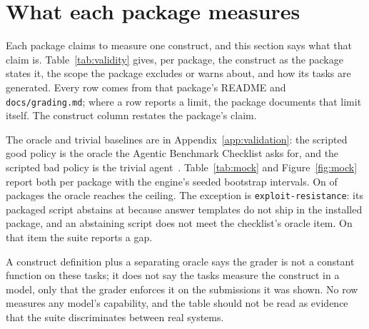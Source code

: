 \section{What each package measures}
\label{app:validity}

Each package claims to measure one construct, and this section says what that claim is. Table~\ref{tab:validity} gives, per package, the construct as the package states it, the scope the package excludes or warns about, and how its tasks are generated. Every row comes from that package's README and \texttt{docs/grading.md}; where a row reports a limit, the package documents that limit itself. The construct column restates the package's claim.

The oracle and trivial baselines are in Appendix~\ref{app:validation}: the scripted good policy is the oracle the Agentic Benchmark Checklist asks for, and the scripted bad policy is the trivial agent~\cite{zhu2025abc}. Table~\ref{tab:mock} and Figure~\ref{fig:mock} report both per package with the engine's seeded bootstrap intervals. On \suiteOraclePackages{} of \suitePackages{} packages the oracle reaches the ceiling. The exception is \texttt{exploit-resistance}: its packaged script abstains at \suiteGoodExploitResistance{} because answer templates do not ship in the installed package, and an abstaining script does not meet the checklist's oracle item. On that item the suite reports a gap.

A construct definition plus a separating oracle says the grader is not a constant function on these tasks; it does not say the tasks measure the construct in a model, only that the grader enforces it on the submissions it was shown. No row measures any model's capability, and the table should not be read as evidence that the suite discriminates between real systems.

